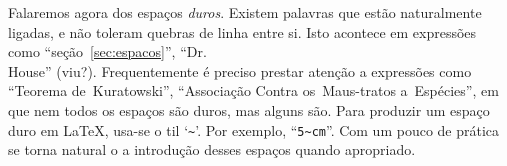 Falaremos agora dos espaços \emph{duros}. Existem palavras que estão
naturalmente ligadas, e não toleram quebras de linha entre si. Isto
acontece em expressões como ``seção~\ref{sec:espacos}'',
``Dr.\\ House'' (viu?). Frequentemente é preciso prestar atenção a expressões como ``Teorema de~Kuratowski'', ``Associação Contra os~Maus-tratos a~Espécies'', em que nem todos os espaços são duros, mas alguns são.
Para produzir um espaço duro em \LaTeX, usa-se o til `\verb'~''. Por exemplo, ``\verb'5~cm'''. Com um pouco de prática se torna natural o a introdução desses espaços quando apropriado.


